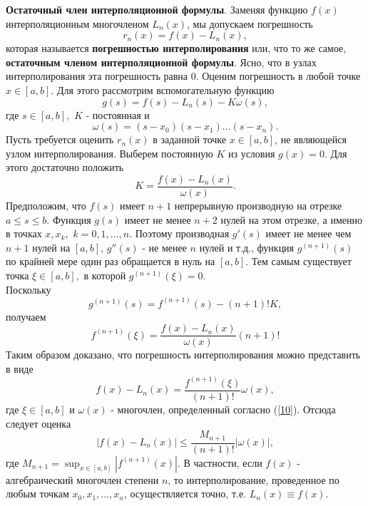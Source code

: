 \textbf{Остаточный член интерполяционной формулы}. Заменяя функцию $f(x)$ интерполяционным многочленом $L_n(x)$, мы допускаем погрешность 
\begin{equation*}
    r_n(x) = f(x) - L_n(x),
\end{equation*}
которая называется \textbf{погрешностью интерполирования} или, что то же самое, \textbf{остаточным членом интерполяционной формулы}. Ясно, что в узлах интерполирования эта погрешность равна 0. Оценим погрешность в любой точке $x \in [a,b]$. Для этого рассмотрим вспомогательную функцию
\begin{equation} \label{9}
    g(s) = f(s) - L_n(s) - K\omega(s), 
\end{equation}
где $s \in [a,b],$ $K$ - постоянная и 
\begin{equation} \label{10}
    \omega(s) = (s-x_0)(s-x_1)...(s-x_n).
\end{equation}
Пусть требуется оценить $r_n(x)$ в заданной точке $x \in [a,b]$, не являющейся узлом интерполирования. Выберем постоянную $K$ из условия $g(x)=0.$ Для этого достаточно положить
\begin{equation*}
    K = \frac{f(x)-L_n(x)}{\omega(x)}.
\end{equation*}
Предположим, что $f(s)$ имеет $n+1$ непрерывную производную на отрезке $a \leq s \leq b.$ Функция $g(s)$ имеет не менее $n+2$ нулей на этом отрезке, а именно в точках $x, x_k,$ $k=0,1,...,n$. Поэтому производная $g'(s)$ имеет не менее чем $n+1$ нулей на $[a,b]$, $g''(s)$ - не менее $n$ нулей и т.д., функция $g^{(n+1)}(s)$ по крайней мере один раз обращается в нуль на $[a,b].$ Тем самым существует точка $\xi \in [a,b], $ в которой $g^{(n+1)}(\xi)=0$. \\
Поскольку 
\begin{equation*}
    g^{(n+1)}(s) = f^{(n+1)}(s)-(n+1)!K,
\end{equation*}
получаем
\begin{equation*}
    f^{(n+1)}(\xi) = \frac{f(x)-L_n(x)}{\omega (x)} (n+1)!
\end{equation*}
Таким образом доказано, что погрешность интерполирования можно представить в виде
\begin{equation}
    f(x)-L_n(x) = \frac{f^{(n+1)}(\xi)}{(n+1)!}\omega(x),
\end{equation}
где $\xi \in [a,b]$ и $\omega(x)$ - многочлен, определенный согласно (\ref{10}).
Отсюда следует оценка 
\begin{equation*}
    |f(x)-L_n(x)| \leq \frac{M_{n+1}}{(n+1)!} |\omega(x)|,
\end{equation*}
где $M_{n+1} = \sup_{x \in [a,b]}|f^{(n+1)}(x)|.$ В частности, если $f(x)$ - алгебраический многочлен степени $n$, то интерполирование, проведенное по любым точкам $x_0, x_1, ..., x_n$, осуществляется точно, т.е. $L_n(x) \equiv f(x).$ 
